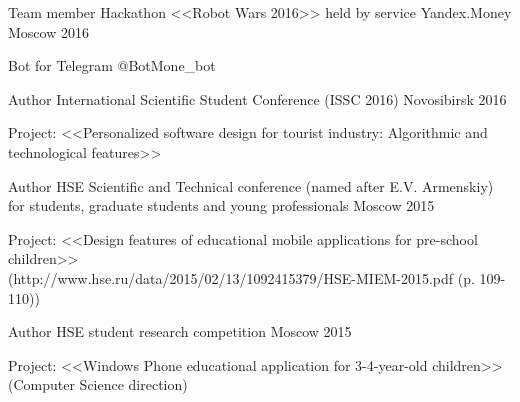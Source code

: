 \begin{cventries}

\cventry
{Team member} %
{Hackathon <<Robot Wars 2016>> held by service Yandex.Money} %
{Moscow} %
{2016} %
{ %
\begin{cvitems}
\item {Bot for Telegram @BotMone\_bot}
\end{cvitems}
}


\cventry
{Author} %
{International Scientific Student Conference (ISSC 2016)} %
{Novosibirsk} %
{2016} %
{ %
\begin{cvitems}
\item {Project: <<Personalized software design for tourist industry: Algorithmic and technological features>>}
\end{cvitems}
}


\cventry
{Author} %
{HSE Scientific and Technical conference (named after E.V. Armenskiy) for students, graduate students and young professionals} %
{Moscow} %
{2015} %
{ %
\begin{cvitems}
\item {Project: <<Design features of educational mobile applications for pre-school children>>
	\\ (http://www.hse.ru/data/2015/02/13/1092415379/HSE-MIEM-2015.pdf (p. 109-110))}
\end{cvitems}
}

\cventry
{Author} %
{HSE student research competition} %
{Moscow} %
{2015} %
{ %
\begin{cvitems}
\item {Project: <<Windows Phone educational application for 3-4-year-old children>> (Computer Science direction)}
\end{cvitems}
}

\end{cventries}
